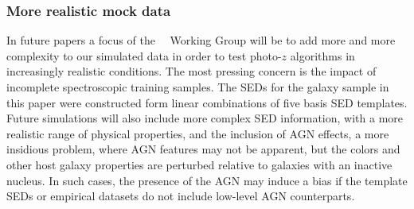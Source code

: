 \subsubsection{More realistic mock data}
\label{sec:futuredata}


In future papers a focus of the \lsstdesc\ \Pz\ Working Group will be to add more and more complexity to our simulated data in order to test photo-$z$ algorithms in increasingly realistic conditions.
The most pressing concern is the impact of incomplete spectroscopic training samples.
The SEDs for the galaxy sample in this paper were constructed form linear combinations of five basis SED templates.
Future simulations will also include more complex SED information, with a more realistic range of physical properties, and the inclusion of AGN effects, a more insidious problem, where AGN features may not be apparent, but the colors and other host galaxy properties are perturbed relative to galaxies with an inactive nucleus.
In such cases, the presence of the AGN may induce a bias if the template SEDs or empirical datasets do not include low-level AGN counterparts.

